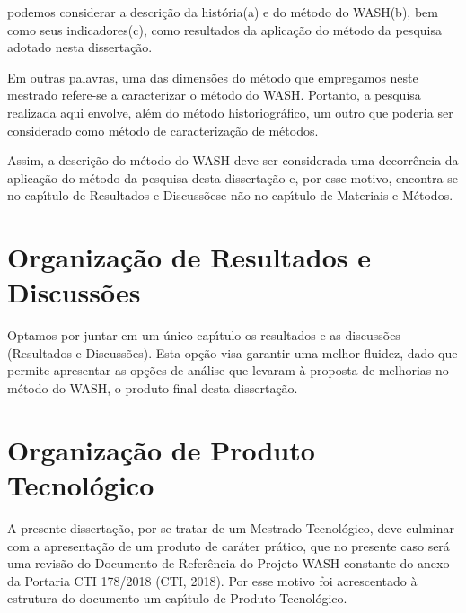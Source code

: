 \documentclass[
12pt,		%
openright,	%
twoside,  %
a4paper,			%
chapter=TITLE,		%
english,			%
french,				%
spanish,			%
brazil				%
]{USPSC-classe/USPSC_RedarTex}
\begin{document}
podemos considerar a descri\c{c}\~ao da hist\'oria(a) e do m\'etodo do WASH(b), bem como seus indicadores(c), como resultados da aplica\c{c}\~ao do m\'etodo da pesquisa adotado nesta disserta\c{c}\~ao.








Em outras palavras, uma das dimens\~oes do m\'etodo que empregamos neste mestrado refere-se a caracterizar o m\'etodo do WASH. Portanto, a pesquisa realizada aqui envolve, al\'em do m\'etodo historiogr\'afico, um outro que poderia ser considerado como m\'etodo de caracteriza\c{c}\~ao de m\'etodos.








Assim, a descri\c{c}\~ao do m\'etodo do WASH deve ser considerada uma decorr\^encia da aplica\c{c}\~ao do m\'etodo da pesquisa desta disserta\c{c}\~ao e, por esse motivo, encontra-se no cap\'{\i}tulo de \textquotedbl Resultados e Discuss\~oes\textquotedbl  e n\~ao no cap\'{\i}tulo de \textquotedbl Materiais e M\'etodos\textquotedbl .








\section[Organiza\c{c}\~ao de Resultados e Discuss\~oes]{Organiza\c{c}\~ao de Resultados e Discuss\~oes}\label{Organiza\c{c}\~ao de Resultados e Discuss\~oes}
Optamos por juntar em um \'unico cap\'{\i}tulo os resultados e as discuss\~oes (\textquotedbl Resultados e Discuss\~oes\textquotedbl ). Esta op\c{c}\~ao visa garantir uma melhor fluidez, dado que permite apresentar as op\c{c}\~oes de an\'alise que levaram \`a proposta de melhorias no m\'etodo do WASH, o produto final desta disserta\c{c}\~ao.








\section[Organiza\c{c}\~ao de Produto Tecnol\'ogico]{Organiza\c{c}\~ao de Produto Tecnol\'ogico}\label{Organiza\c{c}\~ao de Produto Tecnol\'ogico}
A presente disserta\c{c}\~ao, por se tratar de um Mestrado Tecnol\'ogico, deve culminar com a apresenta\c{c}\~ao de um \textquotedbl produto de car\'ater pr\'atico\textquotedbl , que no presente caso ser\'a uma revis\~ao do Documento de Refer\^encia do Projeto WASH  constante do anexo da  Portaria CTI 178/2018 (CTI, 2018). Por esse motivo foi acrescentado \`a estrutura do documento um cap\'{\i}tulo de \textquotedbl Produto Tecnol\'ogico\textquotedbl .
\end{document}
